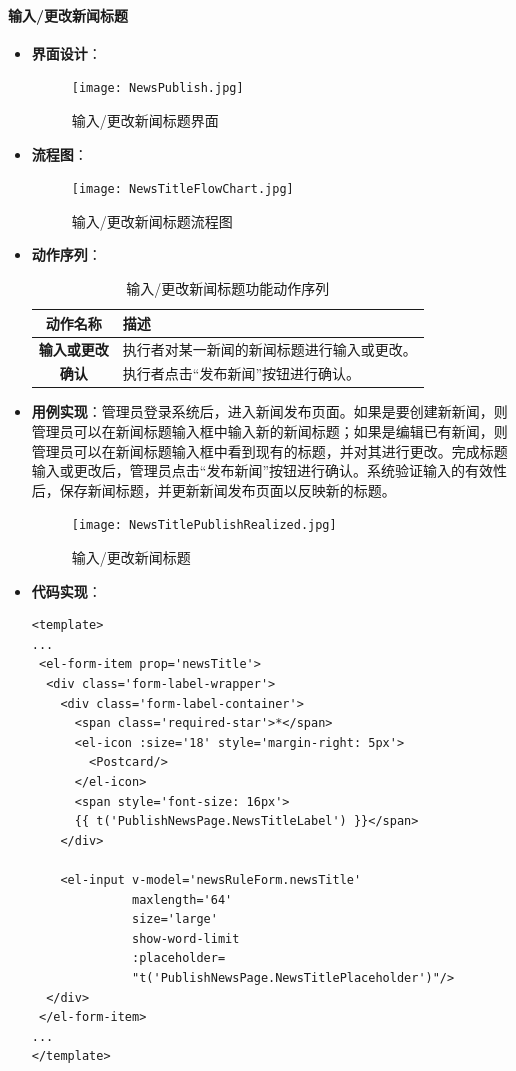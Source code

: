 \paragraph{输入/更改新闻标题}
\begin{itemize}
	\item \textbf{界面设计}：
	\begin{figure}[H]
		\centering
		\texttt{[image: NewsPublish.jpg]}
		\caption{输入/更改新闻标题界面}
		\label{NewsPublish}
	\end{figure}
	\item \textbf{流程图}：
	\begin{figure}[H]
		\centering
		\texttt{[image: NewsTitleFlowChart.jpg]}
		\caption{输入/更改新闻标题流程图}
		\label{NewsTitleFlowChart}
	\end{figure}
	\item \textbf{动作序列}：
	\begin{table}[H]
		\centering
		\caption{输入/更改新闻标题功能动作序列}
		\renewcommand\arraystretch{1.5}
		\begin{tabular}{|c|>{\raggedright\arraybackslash}p{10cm}|}
			\hline
			\textbf{动作名称} & \textbf{描述} \\ \hline
			\textbf{输入或更改} & 执行者对某一新闻的新闻标题进行输入或更改。 \\ \hline
			\textbf{确认} & 执行者点击“发布新闻”按钮进行确认。 \\ \hline
		\end{tabular}
	\end{table}
	\item \textbf{用例实现}：管理员登录系统后，进入新闻发布页面。如果是要创建新新闻，则管理员可以在新闻标题输入框中输入新的新闻标题；如果是编辑已有新闻，则管理员可以在新闻标题输入框中看到现有的标题，并对其进行更改。完成标题输入或更改后，管理员点击“发布新闻”按钮进行确认。系统验证输入的有效性后，保存新闻标题，并更新新闻发布页面以反映新的标题。
	\begin{figure}[H]
		\centering
		\texttt{[image: NewsTitlePublishRealized.jpg]}
		\caption{输入/更改新闻标题}
		\label{NewsTitlePublishRealized}
	\end{figure}
	\item \textbf{代码实现}：
	\begin{verbatim}
<template>
...
 <el-form-item prop='newsTitle'>
  <div class='form-label-wrapper'>
    <div class='form-label-container'>
      <span class='required-star'>*</span>
      <el-icon :size='18' style='margin-right: 5px'>
        <Postcard/>
      </el-icon>
      <span style='font-size: 16px'>
      {{ t('PublishNewsPage.NewsTitleLabel') }}</span>
    </div>
	
    <el-input v-model='newsRuleForm.newsTitle'
              maxlength='64'
              size='large'
              show-word-limit
              :placeholder=
              "t('PublishNewsPage.NewsTitlePlaceholder')"/>
  </div>
 </el-form-item>
...
</template>
	\end{verbatim}
\end{itemize}

